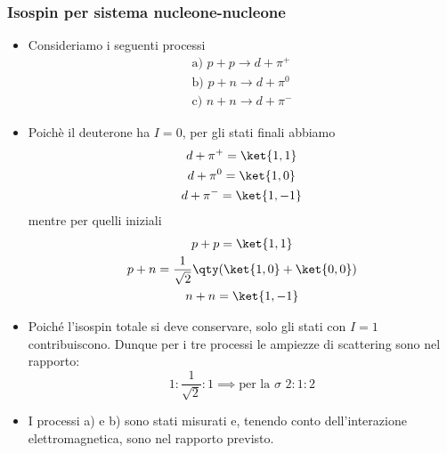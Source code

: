 \subsubsection{Isospin per sistema nucleone-nucleone}
\begin{itemize}
\item Consideriamo i seguenti processi
    \begin{gather*}
    \text{a) }p+p\to d+\pi^+\\
    \text{b) }p+n\to d+\pi^0\\
    \text{c) }n+n\to d+\pi^-
    \end{gather*}
\item Poichè il deuterone ha $I=0$, per gli stati finali abbiamo 
\begin{gather*}
    d+\pi^+=\ket{1,1}\\
    d+\pi^0=\ket{1,0}\\
    d+\pi^-=\ket{1,-1}
\end{gather*}
mentre per quelli iniziali
\begin{gather*}
    p+p=\ket{1,1}\\
    p+n=\frac1{\sqrt2}\qty(\ket{1,0}+\ket{0,0})\\
    n+n=\ket{1,-1}
\end{gather*}
\item Poiché l'isospin totale si deve conservare, solo gli stati con $I=1$ contribuiscono. Dunque per i tre processi le ampiezze di scattering sono nel rapporto:
\begin{equation*}
    1:\frac1{\sqrt2}:1\implies\text{per la }\sigma\,\, 2:1:2
\end{equation*}
\item I processi a) e b) sono stati misurati e, tenendo conto dell'interazione elettromagnetica, sono nel rapporto previsto.
\end{itemize}
